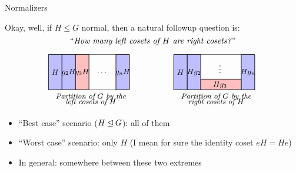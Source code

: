 \documentclass[8pt, handout]{beamer}
\newcommand{\Pause}{\pause}      %
\begin{document}
\begin{frame}{Normalizers}

  Okay, well, if $H \leq G$  normal, then a natural followup question is:
  \[
  \text{``\emph{How many left cosets of $H$ are right cosets?}''}
  \]

  \vspace{-2mm}\Pause
  
  \[
  \begin{tikzpicture}[scale=.75,xscale=1.1]
    \tikzstyle{every node}=[font=\small]
    \begin{scope}[shift={(0,0)}]
      \draw[thin,fill=boxBlue] (0,0) rectangle (.7,2);
      \draw[thin,fill=boxBlue] (.7,0) rectangle (1.4,2);
      \draw[thin,fill=boxRed] (1.4,0) rectangle (2.1,2);
      \draw[thin,fill=boxBlue] (3.5,0) rectangle (4.2,2);
      \draw[thin] (0,0) rectangle (4.2,2);
      \draw[thin] (.7,0) -- (.7,2);
      \node at (.35,1) {$H$};
      \node at (1.05,1) {$g_2H$};
      \draw[thin] (1.4,0) -- (1.4,2);
      \node at (1.75,1) {$g_3H$};
      \draw[thin] (2.1,0) -- (2.1,2);
      \draw[thin] (3.5,0) -- (3.5,2);
      \node at (3.85,1) {$g_nH$};
      \node at (2.8,1) {\normalsize $\dots$};
      \node at (2.2,-.4) {\emph{Partition of $G$ by the}};
      \node at (2.2,-.7) {\emph{left cosets of $H$}};
    \end{scope}
    \begin{scope}[shift={(6.5,0)}]
      \draw[thin,fill=boxBlue] (0,0) rectangle (.7,2);
      \draw[thin,fill=boxBlue] (.7,0) rectangle (1.4,2);
      \draw[thin,fill=boxBlue] (3.5,0) rectangle (4.2,2);
      \draw[thin,fill=boxRed] (1.4,0) rectangle (3.5,.6);
      \draw[thin] (0,0) rectangle (4.2,2);
      \draw[thin] (.7,0) -- (.7,2);
      \node at (.35,1) {$H$};
      \node at (1.05,1) {$Hg_2$};
      \draw[thin] (1.4,0) -- (1.4,2);
      \node at (2.4,.28) {$Hg_3$};
      \draw[thin] (1.4,.6) -- (3.5,.6);
      \draw[thin] (3.5,0) -- (3.5,2);
      \node at (3.85,1) {$Hg_n$};
      \node at (2.4,1.3) {\normalsize $\vdots$};
      \node at (2.2,-.4) {\emph{Partition of $G$ by the}};
      \node at (2.2,-.7) {\emph{right cosets of $H$}};
    \end{scope}
  \end{tikzpicture}
  \]

  \vspace{-2mm}\Pause
  
  \begin{itemize}
  \item ``Best case'' scenario ($H\unlhd G$): all of them \Pause
  \item ``Worst case'' scenario: only $H$ (I mean for sure the identity coset $eH = He$) \Pause
  \item In general: somewhere between these two extremes
  \end{itemize}
  

\end{frame}
\end{document}
